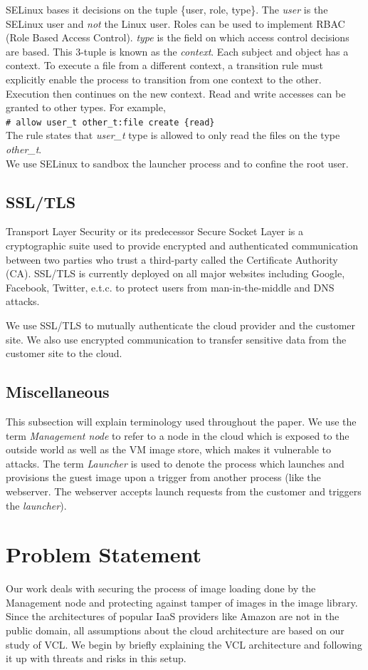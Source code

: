 \documentclass[10pt,twocolumn,pdftex]{article}
\begin{document}
SELinux bases it decisions on the tuple \{user, role, type\}. The \emph{user} is the SELinux user and \emph{not} the Linux user. Roles can be used to implement RBAC (Role Based Access Control). \emph{type} is the field on which access control decisions are based. This 3-tuple is known as the \emph{context}. Each subject and object has a context. To execute a file from a different context, a transition rule must explicitly enable the process to transition from one context to the other. Execution then continues on the new context. Read and write accesses can be granted to other types. For example,\\
{\tt \# allow user\_t other\_t:file create \{read\}} \\
The rule states that \emph{user\_t} type is allowed to only read the files on the type \emph{other\_t}.\\

We use SELinux to sandbox the launcher process and to confine the root user.

\subsection{SSL/TLS}
Transport Layer Security or its predecessor Secure Socket Layer is a cryptographic suite used to provide encrypted and authenticated communication between two parties who trust a third-party called the Certificate Authority (CA). SSL/TLS is currently deployed on all major websites including Google, Facebook, Twitter, e.t.c. to protect users from man-in-the-middle and DNS attacks.

We use SSL/TLS to mutually authenticate the cloud provider and the customer site. We also use encrypted communication to transfer sensitive data from the customer site to the cloud.

\subsection{Miscellaneous}
This subsection will explain terminology used throughout the paper.
We use the term \emph{Management node} to refer to a node in the cloud which is exposed to the outside world as well as the VM image store, which makes it vulnerable to attacks. The term \emph{Launcher} is used to denote the process which launches and provisions the guest image upon a trigger from another process (like the webserver. The webserver accepts launch requests from the customer and triggers the \emph{launcher}). 

\section{Problem Statement}
\label{sec:problem}
Our work deals with securing the process of image loading done by the Management node and protecting against tamper of images in the image library. Since the architectures of popular IaaS providers like Amazon are not in the public domain, all assumptions about the cloud architecture are based on our study of VCL. We begin by briefly explaining the VCL architecture and following it up with threats and risks in this setup.
\end{document}
